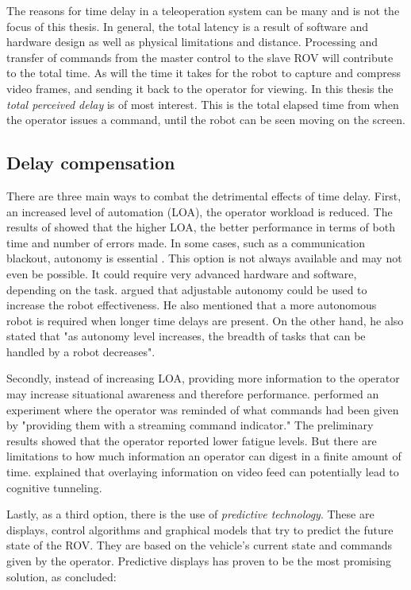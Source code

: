 

The reasons for time delay in a teleoperation system can be many and is not the focus of this thesis. In general, the total latency is a result of software and hardware design as well as physical limitations and distance.
Processing and transfer of commands from the master control to the slave ROV will contribute to the total time. As will the time it takes for the robot to capture and compress video frames, and sending it back to the operator for viewing. 
In this thesis the \emph{total perceived delay} is of most interest. This is the total elapsed time from when the operator issues a command, until the robot can be seen moving on the screen.

\subsection{Delay compensation}

There are three main ways to combat the detrimental effects of time delay. First, an increased level of automation (LOA), the operator workload is reduced. The results of \citet{Luck2006} showed that the higher LOA, the better performance in terms of both time and number of errors made. In some cases, such as a communication blackout, autonomy is essential \citep{Dorais1999}. This option is not always available and may not even be possible. It could require very advanced hardware and software, depending on the task. \citet{Goodrich2001} argued that adjustable autonomy could be used to increase the robot effectiveness. He also mentioned that a more autonomous robot is required when longer time delays are present. On the other hand, he also stated that "as autonomy level increases, the breadth of tasks that can be handled by a robot decreases".

Secondly, instead of increasing LOA, providing more information to the operator may increase situational awareness and therefore performance. \citet{Miller2005} performed an experiment where the operator was reminded of what commands had been given by "providing them with a streaming command indicator." The preliminary results showed that the operator reported lower fatigue levels. But there are limitations to how much information an operator can digest in a finite amount of time. \citet	{Chen2007} explained that overlaying information on video feed can potentially lead to cognitive tunneling.

Lastly, as a third option, there is the use of \emph{predictive technology}. These are displays, control algorithms and graphical models that try to predict the future state of the ROV. They are based on the vehicle's current state and commands given by the operator. Predictive displays has proven to be the most promising solution, as \citet{Chen2007} concluded:

